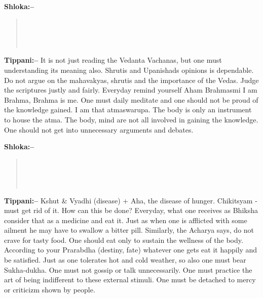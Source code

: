 \textbf{Shloka:–}

\begin{verse}
 \\\\\\ 
\end{verse}

\textbf{Tippani:–} It is not just reading the Vedanta Vachanas, but one must understanding its meaning also. Shrutis and Upanishads opinions is dependable. Do not argue on the mahavakyas, shrutis and the importance of the Vedas. Judge the scriptures justly and fairly. Everyday remind yourself Aham Brahmasmi I am Brahma, Brahma is me. One must daily meditate and one should not be proud of the knowledge gained. I am that atmaswarupa. The body is only an instrument to house the atma. The body, mind are not all involved in gaining the knowledge. One should not get into unnecessary arguments and debates.

\textbf{Shloka:–}

\begin{verse}
 \\\\\\ 
\end{verse}

\textbf{Tippani:–} Kshut \& Vyadhi (disease) + Aha, the disease of hunger. Chikitsyam - must get rid of it. How can this be done? Everyday, what one receives as Bhiksha consider that as a medicine and eat it. Just as when one is afflicted with some ailment he may have to swallow a bitter pill. Similarly, the Acharya says, do not crave for tasty food. One should eat only to sustain the wellness of the body. According to your Prarabdha (destiny, fate) whatever one gets eat it happily and be satisfied. Just as one tolerates hot and cold weather, so also one must bear Sukha-dukha. One must not gossip or talk unnecessarily. One must practice the art of being indifferent to these external stimuli. One must be detached to mercy or criticizm shown by people.


